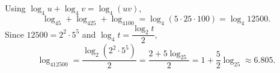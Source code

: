 Using $\log_4u+\log_4v=\log_4(uv)$,
\[
\log_45+\log_425+\log_4100=\log_4(5\cdot25\cdot100)=\log_4 12500 .
\]
Since $12500=2^2\cdot5^5$ and $\log_4t=\dfrac{\log_2t}{2}$,
\[
\log_412500=\dfrac{\log_2\left(2^2\cdot5^5\right)}{2}=\dfrac{2+5\log_25}{2}=\boxed{1+\dfrac{5}{2}\log_25}\approx6.805 .
\]
